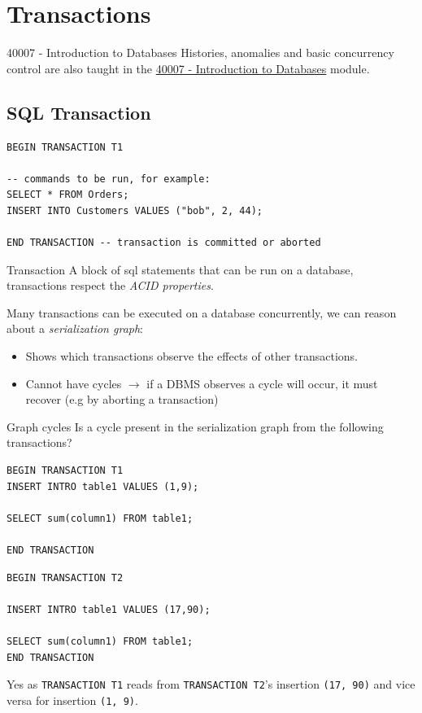 \chapter{Transactions}
\label{chap:transactions}
\begin{sidenotebox}{40007 - Introduction to Databases}
    Histories, anomalies and basic concurrency control are also taught in the \href{https://www.doc.ic.ac.uk/~pjm/idb/}{40007 - Introduction to Databases} module.
\end{sidenotebox}
\section{SQL Transaction}
\begin{verbatim}
BEGIN TRANSACTION T1

-- commands to be run, for example:
SELECT * FROM Orders;
INSERT INTO Customers VALUES ("bob", 2, 44);

END TRANSACTION -- transaction is committed or aborted
\end{verbatim}
\begin{definitionbox}{Transaction}
    A block of sql statements that can be run on a database, transactions respect the \textit{ACID properties}.
\end{definitionbox}

Many transactions can be executed on a database concurrently, we can reason about a \textit{serialization graph}:
\begin{itemize}
    \item Shows which transactions observe the effects of other transactions.
    \item Cannot have cycles $\to$ if a DBMS observes a cycle will occur, it must recover (e.g by aborting a transaction)
\end{itemize}

\begin{examplebox}{Graph cycles}
    Is a cycle present in the serialization graph from the following transactions?
    \\ \begin{minipage}[t]{.49\textwidth}
        \begin{verbatim}
BEGIN TRANSACTION T1
INSERT INTRO table1 VALUES (1,9);

SELECT sum(column1) FROM table1;

END TRANSACTION
        \end{verbatim}
    \end{minipage} \hfill \begin{minipage}[t]{.49\textwidth}
        \begin{verbatim}
BEGIN TRANSACTION T2

INSERT INTRO table1 VALUES (17,90);

SELECT sum(column1) FROM table1;
END TRANSACTION
        \end{verbatim}
    \end{minipage}
    \tcblower
    Yes as \texttt{TRANSACTION T1} reads from \texttt{TRANSACTION T2}'s insertion \texttt{(17, 90)} and vice versa for insertion \texttt{(1, 9)}.
\end{examplebox}

